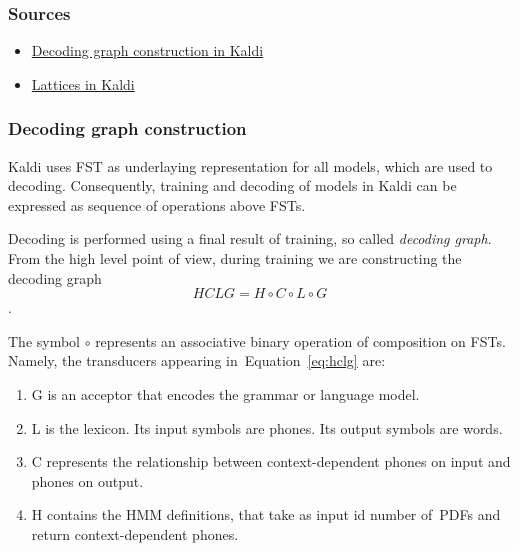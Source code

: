 \subsubsection*{Sources} %

\begin{itemize}
    \item \href{http://kaldi.sourceforge.net/graph.html} {Decoding graph construction in Kaldi}
    \item \href{http://kaldi.sourceforge.net/lattices.html} {Lattices in Kaldi}
\end{itemize}

\subsubsection*{Decoding graph construction} %
Kaldi uses \ac{FST} as underlaying representation for all models, which are used to decoding. Consequently, training and decoding of models in Kaldi can be expressed as sequence of operations above \acp{FST}.

Decoding is performed using a final result of training, so called {\it decoding graph}. 
From the high level point of view,
during training we are constructing the decoding graph 
\begin{equation} \label{eq:hclg}
HCLG = H\circ C\circ L\circ G
\end{equation}.

The symbol $\circ$ represents an associative binary operation of composition on \acp{FST}.
Namely, the transducers appearing in~Equation~\ref{eq:hclg} are:
\begin{enumerate}
    \item G is an acceptor that encodes the grammar or language model.
    \item L is the lexicon. Its input symbols are phones. Its output symbols are words.
    \item C represents the relationship between context-dependent phones on input and phones on output.
    \item H contains the \ac{HMM} definitions, that take as input id number of~\acp{PDF} and return context-dependent phones.
\end{enumerate}

